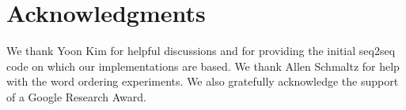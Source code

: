 \documentclass[11pt,letterpaper]{article}
\begin{document}
 
\section*{Acknowledgments} We thank Yoon Kim for helpful discussions and for providing the initial seq2seq code on which our implementations are based. We thank Allen Schmaltz for help with the word ordering experiments. We also gratefully acknowledge the support of a Google Research Award.

\nocite{bahdanau16an}



\end{document}
